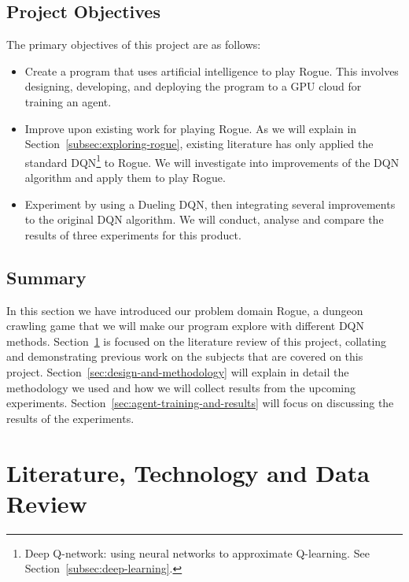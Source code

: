 \documentclass[12pt,a4paper]{article}
\begin{document}
    \subsection{Project Objectives}\label{subsec:objectives}
    The primary objectives of this project are as follows:
    \begin{itemize}
        \item Create a program that uses artificial intelligence to play Rogue.
        This involves designing, developing, and deploying the program to a GPU cloud for training an agent.
        \item Improve upon existing work for playing Rogue.
        As we will explain in Section~\ref{subsec:exploring-rogue}, existing literature has only applied the standard
        DQN\footnote{Deep Q-network: using neural networks to approximate Q-learning. See Section~\ref{subsec:deep-learning}.} to Rogue.
        We will investigate into improvements of the DQN algorithm and apply them to play Rogue.
        \item Experiment by using a Dueling DQN, then integrating several improvements to the original DQN algorithm.
        We will conduct, analyse and compare the results of three experiments for this product.
    \end{itemize}

    \subsection{Summary}\label{subsec:summary1}
    In this section we have introduced our problem domain Rogue, a dungeon crawling game that we will make our program explore with different DQN methods.
    Section~\ref{sec:literature-technology-and-data-review} is focused on the literature review of
    this project, collating and demonstrating previous work on the subjects that are covered on this project.
    Section~\ref{sec:design-and-methodology} will explain in detail the methodology we used and how we will collect
    results from the upcoming experiments.
    Section~\ref{sec:agent-training-and-results} will focus on discussing the results of the experiments.

    \section{Literature, Technology and Data Review}\label{sec:literature-technology-and-data-review}
\end{document}
